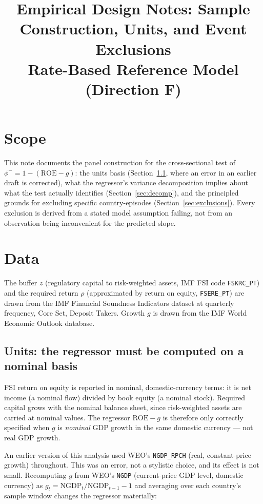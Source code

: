 \documentclass[11pt]{article}
\title{Empirical Design Notes: Sample Construction, Units, and Event
Exclusions\\
\large Rate-Based Reference Model (Direction F)}
\author{}
\date{}
\begin{document}
\maketitle

\section*{Scope}

This note documents the panel construction for the cross-sectional test of
$\phi^- = 1 - (\mathrm{ROE} - g)$: the units basis (Section~\ref{sec:units},
where an error in an earlier draft is corrected), what the regressor's
variance decomposition implies about what the test actually identifies
(Section~\ref{sec:decomp}), and the principled grounds for excluding
specific country-episodes (Section~\ref{sec:exclusions}). Every exclusion
is derived from a stated model assumption failing, not from an observation
being inconvenient for the predicted slope.

\section{Data}

The buffer $z$ (regulatory capital to risk-weighted assets, IMF FSI code
\texttt{FSKRC\_PT}) and the required return $\rho$ (approximated by return
on equity, \texttt{FSERE\_PT}) are drawn from the IMF Financial Soundness
Indicators dataset at quarterly frequency, Core Set, Deposit Takers.
Growth $g$ is drawn from the IMF World Economic Outlook database.

\subsection{Units: the regressor must be computed on a nominal basis}
\label{sec:units}

FSI return on equity is reported in nominal, domestic-currency terms: it
is net income (a nominal flow) divided by book equity (a nominal stock).
Required capital grows with the nominal balance sheet, since risk-weighted
assets are carried at nominal values. The regressor $\mathrm{ROE} - g$
is therefore only correctly specified when $g$ is \emph{nominal} GDP
growth in the same domestic currency --- not real GDP growth.

An earlier version of this analysis used WEO's \texttt{NGDP\_RPCH} (real,
constant-price growth) throughout. This was an error, not a stylistic
choice, and its effect is not small. Recomputing $g$ from WEO's
\texttt{NGDP} (current-price GDP level, domestic currency) as
$g_t = \mathrm{NGDP}_t/\mathrm{NGDP}_{t-1} - 1$ and averaging over each
country's sample window changes the regressor materially:
\end{document}
